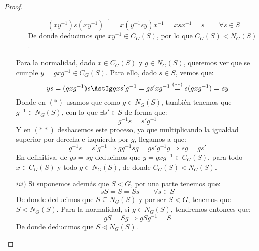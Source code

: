 \begin{prop}
\begin{proof}
\begin{enumerate}
\begin{itemize}
\begin{equation*}
                            (xy^{-1})s{(xy^{-1})}^{-1} = x(y^{-1}sy)x^{-1} = xsx^{-1} = s \qquad \forall s\in S
                        \end{equation*}
                        De donde deducimos que $xy^{-1}\in C_G(S)$, por lo que $C_G(S) < N_G(S)$.
                \end{itemize}
                Para la normalidad, dado $x\in C_G(S)$ y $g\in N_G(S)$, queremos ver que se cumple $y = gxg^{-1}\in C_G(S)$. Para ello, dado $s\in S$, vemos que:
                \begin{equation*}
                    ys = (gxg^{-1})s \AstIg gxs'g^{-1} = gs'xg^{-1} \stackrel{(\ast\ast)}{=} s(gxg^{-1}) = sy
                \end{equation*}
                Donde en $(\ast)$ usamos que como $g\in N_G(S)$, también tenemos que $g^{-1}\in N_G(S)$, con lo que $\exists s' \in S$ de forma que:
                \begin{equation*}
                    g^{-1}s = s'g^{-1}
                \end{equation*}
                Y en $(\ast\ast)$ deshacemos este proceso, ya que multiplicando la igualdad superior por derecha e izquierda por $g$, llegamos a que:
                \begin{equation*}
                    g^{-1}s = s'g^{-1} \Longrightarrow gg^{-1}sg = gs'g^{-1}g \Longrightarrow sg = gs'
                \end{equation*}
                En definitiva, de $ys = sy$ deducimos que $y = gxg^{-1}\in C_G(S)$, para todo $x\in C_G(S)$ y todo $g\in N_G(S)$, de donde $C_G(S)\lhd N_G(S)$.
            \item[$iii)$] Si suponemos además que $S<G$, por una parte tenemos que:
                \begin{equation*}
                    sS = S = Ss \qquad \forall s\in S
                \end{equation*}
                De donde deducimos que $S\subseteq N_G(S)$ y por ser $S<G$, tenemos que $S < N_G(S)$. Para la normalidad, si $g\in N_G(S)$, tendremos entonces que:
                \begin{equation*}
                    gS = Sg \Longrightarrow gSg^{-1} = S
                \end{equation*}
                De donde deducimos que $S \lhd N_G(S)$.
        \end{enumerate}
    \end{proof}
\end{prop}

